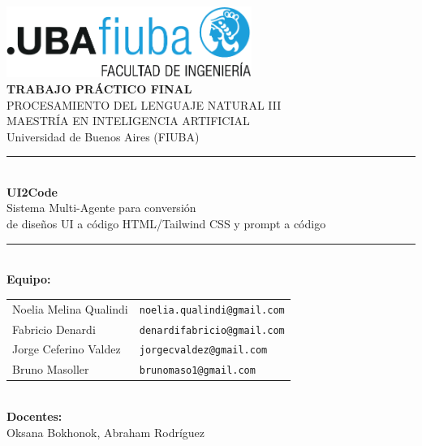 \documentclass[12pt,a4paper]{article}
\begin{document}
\begin{titlepage}
    \centering

    \includegraphics[width=0.6\textwidth]{../docs/uba.png}\\[1cm]
    
    {\LARGE\bfseries TRABAJO PRÁCTICO FINAL\\[0.5cm]}
    {\Large PROCESAMIENTO DEL LENGUAJE NATURAL III\\[0.3cm]}
    {\large MAESTRÍA EN INTELIGENCIA ARTIFICIAL\\[0.2cm]}
    {\large Universidad de Buenos Aires (FIUBA)\\[1cm]}
    
    \rule{\textwidth}{1.5pt}\\[0.4cm]
    {\Huge\bfseries UI2Code\\[0.2cm]}
    {\LARGE Sistema Multi-Agente para conversión\\[0.1cm] de diseños UI a código HTML/Tailwind CSS y prompt a código\\[0.2cm]}
    \rule{\textwidth}{1pt}\\[1cm]
    
    {\large\bfseries Equipo:\\[0.3cm]}
    \begin{tabular}{ll}
        Noelia Melina Qualindi & \texttt{noelia.qualindi@gmail.com} \\
        Fabricio Denardi & \texttt{denardifabricio@gmail.com} \\
        Jorge Ceferino Valdez & \texttt{jorgecvaldez@gmail.com} \\
        Bruno Masoller & \texttt{brunomaso1@gmail.com}
    \end{tabular}\\[1cm]
    
    {\large\bfseries Docentes:\\[0.3cm]}
    Oksana Bokhonok, Abraham Rodríguez\\[1cm]
    

\end{titlepage}
\end{document}
